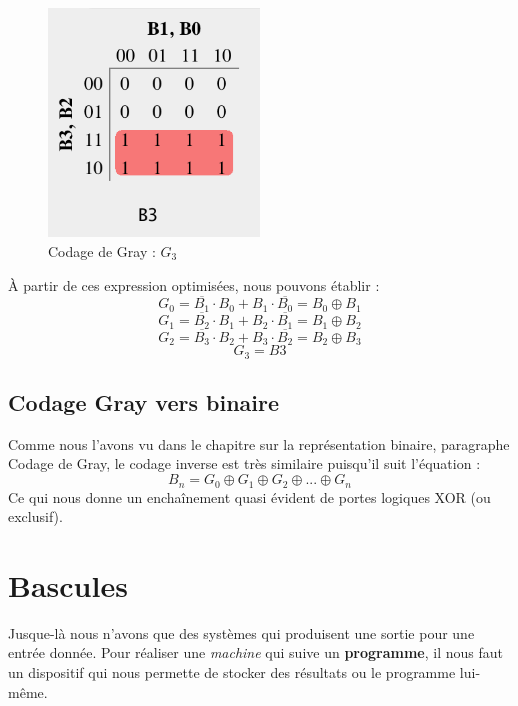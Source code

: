 \documentclass{book}
\theoremstyle{definition}
\theoremstyle{definition}
\begin{document}
\begin{figure}
\includegraphics[width=0.5\textwidth]{media/SysLogiques/gray3.png}
    \centering
    \caption{Codage de Gray : $G_3$}
    \label{fig:gray3}
\end{figure}

À partir de ces expression optimisées, nous pouvons établir :
\[G_0 = \overline{B_1}\cdot B_0 + B_1 \cdot \overline{B_0} = B_0 \oplus B_1\]
\[G_1 = \overline{B_2}\cdot B_1 + B_2 \cdot \overline{B_1} = B_1 \oplus B_2\]
\[G_2 = \overline{B_3}\cdot B_2 + B_3 \cdot \overline{B_2} = B_2 \oplus B_3\]
\[G_3 = B3\]

\subsection{Codage Gray vers binaire}

Comme nous l'avons vu dans le chapitre sur la représentation binaire, paragraphe Codage de Gray, le codage inverse est très similaire puisqu'il suit l'équation :
\[B_n = G_0 \oplus G_1 \oplus G_2 \oplus ... \oplus G_n \]
Ce qui nous donne un enchaînement quasi évident de portes logiques XOR (ou exclusif).

\section{Bascules}
Jusque-là nous n'avons que des systèmes qui produisent une sortie pour une entrée donnée. Pour réaliser une \textit{machine} qui suive un \textbf{programme}, il nous faut un dispositif qui nous permette de stocker des résultats ou le programme lui-même.
\end{document}
